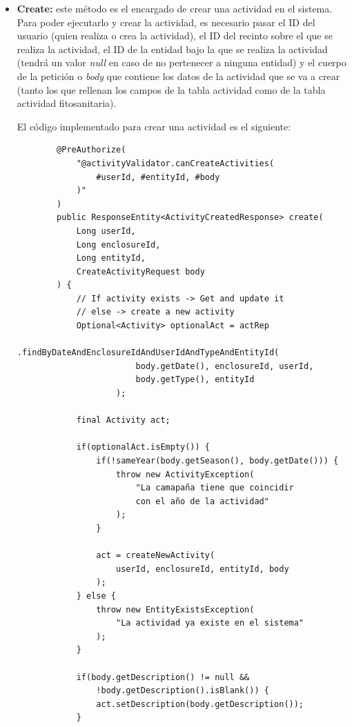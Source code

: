 \begin{itemize}
    \item \textbf{Create:} este método es el encargado de crear una actividad en el sistema. Para poder ejecutarlo y crear la actividad, es necesario pasar el ID del usuario (quien realiza o crea la actividad), el ID del recinto
    sobre el que se realiza la actividad, el ID de la entidad bajo la que se realiza la actividad (tendrá un valor \textit{null} en caso de no pertenecer a ninguna entidad) y el cuerpo de la petición o \textit{body} que contiene
    los datos de la actividad que se va a crear (tanto los que rellenan los campos de la tabla actividad como de la tabla actividad fitosanitaria).

    El código implementado para crear una actividad es el siguiente:

    \begin{verbatim}
        @PreAuthorize(
            "@activityValidator.canCreateActivities(
                #userId, #entityId, #body
            )"
        )
        public ResponseEntity<ActivityCreatedResponse> create(
            Long userId,
            Long enclosureId,
            Long entityId,
            CreateActivityRequest body
        ) {
            // If activity exists -> Get and update it
            // else -> create a new activity
            Optional<Activity> optionalAct = actRep
                    .findByDateAndEnclosureIdAndUserIdAndTypeAndEntityId(
                        body.getDate(), enclosureId, userId, 
                        body.getType(), entityId
                    );

            final Activity act;

            if(optionalAct.isEmpty()) {
                if(!sameYear(body.getSeason(), body.getDate())) {
                    throw new ActivityException(
                        "La camapaña tiene que coincidir 
                        con el año de la actividad"
                    );
                }

                act = createNewActivity(
                    userId, enclosureId, entityId, body
                );
            } else {
                throw new EntityExistsException(
                    "La actividad ya existe en el sistema"
                );
            }

            if(body.getDescription() != null && 
                !body.getDescription().isBlank()) {
                act.setDescription(body.getDescription());
            }


\end{verbatim}
\end{itemize}

